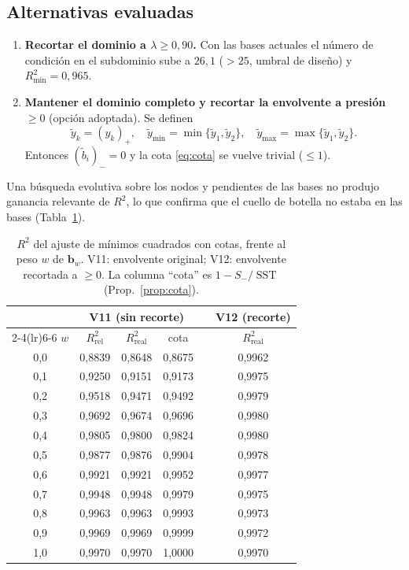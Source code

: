 \documentclass[11pt,twoside]{article}
\theoremstyle{definition}
\theoremstyle{remark}
\newcommand{\pos}[1]{\left(#1\right)_{+}}
\newcommand{\negp}[1]{\left(#1\right)_{-}}
\DeclareMathOperator{\SST}{SST}
\begin{document}
\subsection{Alternativas evaluadas}
\begin{enumerate}
\item \textbf{Recortar el dominio a $\lambda\ge0{,}90$.} Con las bases actuales el número de condición en el subdominio sube a $26{,}1$ ($>25$, umbral de diseño) y $R^2_{\min}=0{,}965$.
\item \textbf{Mantener el dominio completo y recortar la envolvente a presión $\ge0$} (opción adoptada). Se definen
\begin{equation}
 \tilde y_k=\pos{y_k},\quad \tilde y_{\min}=\min\{\tilde y_1,\tilde y_2\},\quad \tilde y_{\max}=\max\{\tilde y_1,\tilde y_2\}.
\end{equation}
Entonces $\negp{\tilde b_i}=0$ y la cota \eqref{eq:cota} se vuelve trivial ($\le1$).
\end{enumerate}
Una búsqueda evolutiva sobre los nodos y pendientes de las bases no produjo ganancia relevante de $R^2$, lo que confirma que el cuello de botella no estaba en las bases (Tabla~\ref{tab:r2}).

\begin{table}[ht]
\centering
\caption{$R^2$ del ajuste de mínimos cuadrados con cotas, frente al peso $w$ de $\bm b_w$. V11: envolvente original; V12: envolvente recortada a $\ge0$. La columna ``cota'' es $1-S_-/\SST$ (Prop.~\ref{prop:cota}).}\label{tab:r2}
\small
\begin{tabular}{c cccc c}
\toprule
 & \multicolumn{3}{c}{V11 (sin recorte)} & & V12 (recorte)\\
\cmidrule(lr){2-4}\cmidrule(lr){6-6}
$w$ & $R^2_{\mathrm{rel}}$ & $R^2_{\mathrm{real}}$ & cota & & $R^2_{\mathrm{real}}$\\
\midrule
0{,}0 & 0{,}8839 & 0{,}8648 & 0{,}8675 & & 0{,}9962\\
0{,}1 & 0{,}9250 & 0{,}9151 & 0{,}9173 & & 0{,}9975\\
0{,}2 & 0{,}9518 & 0{,}9471 & 0{,}9492 & & 0{,}9979\\
0{,}3 & 0{,}9692 & 0{,}9674 & 0{,}9696 & & 0{,}9980\\
0{,}4 & 0{,}9805 & 0{,}9800 & 0{,}9824 & & 0{,}9980\\
0{,}5 & 0{,}9877 & 0{,}9876 & 0{,}9904 & & 0{,}9978\\
0{,}6 & 0{,}9921 & 0{,}9921 & 0{,}9952 & & 0{,}9977\\
0{,}7 & 0{,}9948 & 0{,}9948 & 0{,}9979 & & 0{,}9975\\
0{,}8 & 0{,}9963 & 0{,}9963 & 0{,}9993 & & 0{,}9973\\
0{,}9 & 0{,}9969 & 0{,}9969 & 0{,}9999 & & 0{,}9972\\
1{,}0 & 0{,}9970 & 0{,}9970 & 1{,}0000 & & 0{,}9970\\
\bottomrule
\end{tabular}
\end{table}
\end{document}
